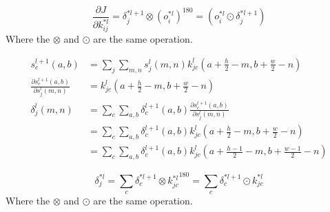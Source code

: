 \documentclass[runningheads,openany]{xhlPaper}
\begin{document}
\begin{displaymath}
\frac{{\partial J}}{{\partial k_{ij}^{*l}}} = \delta _j^{*l + 1} \otimes {\left( {o_i^{*l}} \right)^{180}} = {\left( {o_i^{*l} \odot \delta _j^{*l + 1}} \right)}
\end{displaymath}
Where the $\otimes$ and $\odot$ are the same operation. 

\begin{displaymath}
\begin{aligned}
s_c^{l + 1}(a,b) &= \sum\limits_j {\sum\limits_{m, n} {s_j^l(m,n)k_{jc}^l(a + \frac{h}{2} - m,b+ \frac{w}{2} - n)} } \\
\frac{{\partial s_c^{l + 1}(a,b)}}{{\partial s_j^l(m,n)}} &= k_{jc}^l(a+ \frac{h}{2} - m,b+ \frac{w}{2} - n)\\
\delta _j^l(m,n) &= \sum\limits_c {\sum\limits_{a,b} {\delta _c^{l + 1}(a,b)\frac{{\partial s_c^{l + 1}(a,b)}}{{\partial s_j^l(m,n)}}} } \\
 &= \sum\limits_c {\sum\limits_{a,b} {\delta _c^{l + 1}(a,b)k_{jc}^l(a+ \frac{h}{2} - m,b+ \frac{w}{2} - n)} }\\
 &= \sum\limits_c {\sum\limits_{a,b} {\delta _c^{l + 1}(a,b)k_{jc}^l(a+ \frac{h-1}{2} - m,b+ \frac{w-1}{2} - n)} }
\end{aligned}
\end{displaymath}

\begin{displaymath}
\delta _j^{*l} = \sum\limits_c {\delta _c^{*l + 1} \otimes k{{_{jc}^{*l}}^{180}}}  = \sum\limits_c {\delta _c^{*l + 1} \odot k_{jc}^{*l}}
\end{displaymath}
Where the $\otimes$ and $\odot$ are the same operation. 
\end{document}

